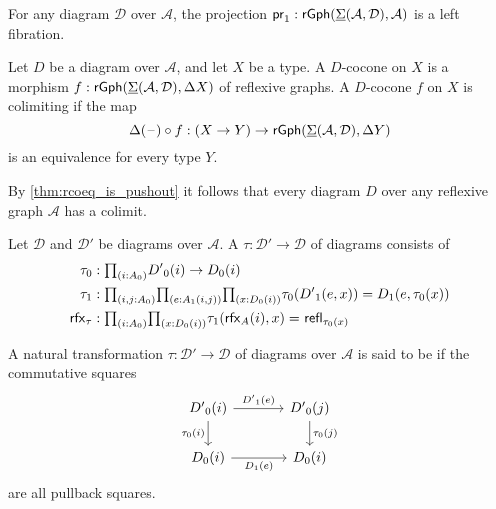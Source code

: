 \begin{lem}
For any diagram $\mathcal{D}$ over $\mathcal{A}$, the projection $\mathsf{pr}_{1} : \mathsf{rGph}(\underline{\Sigma}(\mathcal{A},\mathcal{D}),\mathcal{A})$ is a left fibration.
\end{lem}

\begin{defn}
Let $D$ be a diagram over $\mathcal{A}$, and let $X$ be a type. A $D$-cocone on $X$ is a morphism $f:\mathsf{rGph}(\underline{\Sigma}(\mathcal{A},\mathcal{D}),\Delta X)$ of reflexive graphs. A $D$-cocone $f$ on $X$ is colimiting if the map
\begin{equation*}
\Delta(\mathord{\hspace{1pt}\text{--}\hspace{1pt}})\circ f : (X\to Y)\to \mathsf{rGph}(\underline{\Sigma}(\mathcal{A},\mathcal{D}),\Delta Y)
\end{equation*}
is an equivalence for every type $Y$. 
\end{defn}

\begin{rmk}
By \cref{thm:rcoeq_is_pushout} it follows that every diagram $D$ over any reflexive graph $\mathcal{A}$ has a colimit. 
\end{rmk}

\begin{defn}
Let $\mathcal{D}$ and $\mathcal{D}'$ be diagrams over $\mathcal{A}$. A  $\tau : \mathcal{D}'\to \mathcal{D}$ of diagrams consists of
\begin{align*}
\pts{\tau} & : \prd{i:\pts{A}}\pts{D'}(i)\to\pts{D}(i) \\
\edg{\tau} & : \prd*{i,j:\pts{A}}{e:\edg{A}(i,j)}\prd{x:\pts{D}(i)}\pts{\tau}(\edg{D'}(e,x))=\edg{D}(e,\pts{\tau}(x)) \\
\rfx{\tau} & : \prd{i:\pts{A}}{x:\pts{D}(i)} \dpath{}{}{\edg{\tau}(\rfx{A}(i),x)}{\refl{\pts{\tau}(x)}}
\end{align*}
\end{defn}

\begin{defn}\label{defn:cartesian}
A natural transformation $\tau:\mathcal{D}'\to \mathcal{D}$ of diagrams over $\mathcal{A}$ is said to be  if the commutative squares
\begin{equation*}
\begin{tikzcd}[column sep=large]
\pts{D'}(i) \arrow[r,"{\edg{D'}(e)}"] \arrow[d,swap,"\pts{\tau}(i)"] & \pts{D'}(j) \arrow[d,"\pts{\tau}(j)"] \\
\pts{D}(i) \arrow[r,swap,"{\edg{D}(e)}"] & \pts{D}(i)
\end{tikzcd}
\end{equation*}
are all pullback squares. 
\end{defn}

